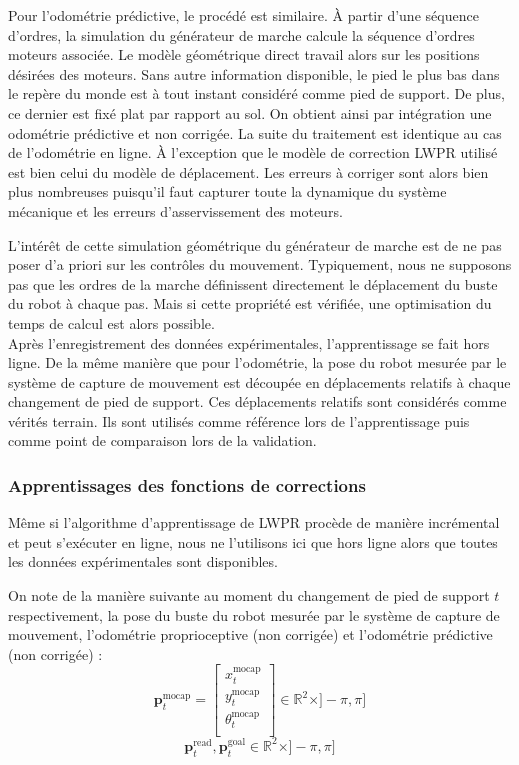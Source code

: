 Pour l'odométrie prédictive, le procédé est similaire.
À partir d'une séquence d'ordres, la simulation du générateur de marche 
calcule la séquence d'ordres moteurs associée.
Le modèle géométrique direct travail alors sur les positions désirées des moteurs.
Sans autre information disponible, le pied le plus bas dans le repère du monde est à tout instant
considéré comme pied de support. De plus, ce dernier est fixé plat par rapport au sol.
On obtient ainsi par intégration une odométrie prédictive et non corrigée.
La suite du traitement est identique au cas de l'odométrie en ligne.
À l'exception que le modèle de correction LWPR utilisé est bien celui du modèle de déplacement.
Les erreurs à corriger sont alors bien plus nombreuses puisqu'il faut capturer
toute la dynamique du système mécanique et les erreurs d'asservissement des moteurs.

L'intérêt de cette simulation géométrique du générateur de marche est de ne pas poser 
d'a priori sur les contrôles du mouvement. 
Typiquement, nous ne supposons pas que les ordres de la marche définissent 
directement le déplacement du buste du robot à chaque pas.
Mais si cette propriété est vérifiée, une optimisation du temps 
de calcul est alors possible.\\

Après l'enregistrement des données expérimentales, l'apprentissage se fait hors ligne.
De la même manière que pour l'odométrie, la pose du robot mesurée par le système
de capture de mouvement est découpée en déplacements relatifs à chaque changement de pied de support.
Ces déplacements relatifs sont considérés comme vérités terrain.
Ils sont utilisés comme référence lors de l'apprentissage puis comme point de comparaison lors de la validation.

\subsubsection{Apprentissages des fonctions de corrections\label{sec:odometry_lwpr_learning}}

Même si l'algorithme d'apprentissage de LWPR procède de manière
incrémental et peut s'exécuter en ligne, nous ne l'utilisons ici 
que hors ligne alors que toutes les données expérimentales sont disponibles.

On note de la manière suivante au moment du changement de pied de support $t$ respectivement, 
la pose du buste du robot mesurée par le système de capture de mouvement, 
l'odométrie proprioceptive (non corrigée) et l'odométrie prédictive (non corrigée) :
$$
\bm{p}_{t}^{\text{mocap}} = 
\begin{bmatrix}
    x_{t}^{\text{mocap}} \\
    y_{t}^{\text{mocap}} \\
    \theta_{t}^{\text{mocap}} \\
\end{bmatrix}
\in
\mathbb{R}^2 \times ]-\pi, \pi]
$$
$$
\bm{p}_{t}^{\text{read}}, \bm{p}_{t}^{\text{goal}}
\in
\mathbb{R}^2 \times ]-\pi, \pi]
$$

